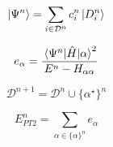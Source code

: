\documentclass[./thesis.tex]{subfiles}
\begin{document}
\begin{equation}
\ket{\Psi^{n}} = \sum_{i \in \mathcal{D}^n} c_i^{n} \ket{D^n_i}
\end{equation}

\begin{equation}
e_\alpha = \frac{\mel{\Psi^n}{\hat{H}}{\alpha}^2}{E^n - H_{\alpha \alpha}}
\end{equation}

\begin{equation}
\mathcal{D}^{n+1} = \mathcal{D}^{n} \cup \{ \alpha^\star \}^n
\end{equation}

\begin{equation}
E_{PT2}^n = \sum_{\alpha \in \{\alpha \}^n} e_\alpha
\end{equation}
\end{document}
